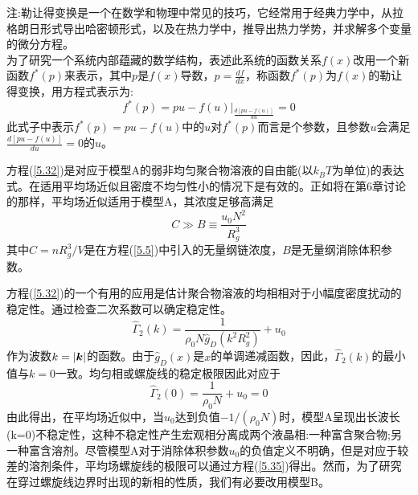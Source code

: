 注:勒让得变换是一个在数学和物理中常见的技巧，它经常用于经典力学中，从拉格朗日形式导出哈密顿形式，以及在热力学中，推导出热力学势，并求解多个变量的微分方程。\\
为了研究一个系统内部蕴藏的数学结构，表述此系统的函数关系$f(x)$改用一个新函数$f^*(p)$来表示，其中$p$是$f(x)$导数，$p =\frac{df}{dx}$，称函数$f^*(p)$为$f(x)$的勒让得变换，用方程式表示为:
\begin{equation*}
f^*(p)=pu-f(u)\big|_{\frac{d[pu-f(u)]}{du}}=0
\end{equation*}
此式子中表示$f^*(p)=pu-f(u)$中的$u$对$f^*(p)$而言是个参数，且参数$u$会满足$\frac{d[pu-f(u)]}{du}=0$的$u$。

方程(\ref{5.32})是对应于模型A的弱非均匀聚合物溶液的自由能(以$k_BT$为单位)的表达式。在适用平均场近似且密度不均匀性小的情况下是有效的。正如将在第6章讨论的那样，平均场近似适用于模型A，其浓度足够高满足
\begin{equation}
C\gg B\equiv\frac{u_0N^2}{R_g^3}
\end{equation}
其中$C=nR_g^3/V$是在方程(\ref{5.5})中引入的无量纲链浓度，$B$是无量纲消除体积参数。

方程(\ref{5.32})的一个有用的应用是估计聚合物溶液的均相相对于小幅度密度扰动的稳定性。通过检查二次系数可以确定稳定性。
\begin{equation}\label{5.34}
\hat{\Gamma}_2(k)=\frac{1}{\rho_0N\hat{g}_D(k^2R_g^2)}+u_0
\end{equation}
作为波数$k=\left|\bm{k}\right|$的函数。由于$\hat{g}_D(x)$是$x$的单调递减函数，因此，$\hat{\Gamma}_2(k)$的最小值与$k=0$一致。均匀相或螺旋线的稳定极限因此对应于
\begin{equation}\label{5.35}
\hat{\Gamma}_2(0)=\frac{1}{\rho_0N}+u_0=0
\end{equation}
由此得出，在平均场近似中，当$u_0$达到负值$-1/(\rho_0N)$时，模型A呈现出长波长(k=0)不稳定性，这种不稳定性产生宏观相分离成两个液晶相:一种富含聚合物;另一种富含溶剂。尽管模型A对于消除体积参数$u_0$的负值定义不明确，但是对应于较差的溶剂条件，平均场螺旋线的极限可以通过方程(\ref{5.35})得出。然而，为了研究在穿过螺旋线边界时出现的新相的性质，我们有必要改用模型B。

